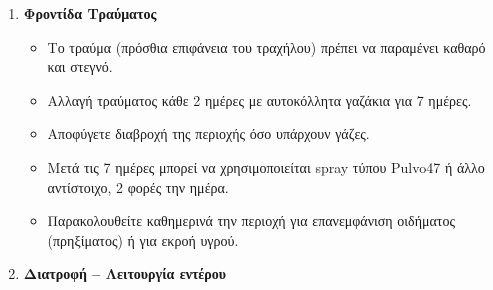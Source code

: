 \documentclass[10pt,greek]{article}
\begin{document}
\begin{enumerate}[label=\arabic*.]
\begin{itemize}
\item \textbf{Αναφέρετε άμεσα:} σοβαρή ή επιδεινούμενη δυσκολία κατάποσης, πνιγμονή, ή βράχνιασμα που δεν βελτιώνεται μετά τις 2 εβδομάδες.
    \end{itemize}
  \item \textbf{Φροντίδα Τραύματος}
      \begin{itemize}
\item Το τραύμα (πρόσθια επιφάνεια του τραχήλου) πρέπει να παραμένει καθαρό και στεγνό.
\item Αλλαγή τραύματος κάθε 2 ημέρες με αυτοκόλλητα γαζάκια για 7 ημέρες.
\item Αποφύγετε διαβροχή της περιοχής όσο υπάρχουν γάζες.
\item Μετά τις 7 ημέρες μπορεί να χρησιμοποιείται spray τύπου Pulvo47 ή άλλο αντίστοιχο, 2 φορές την ημέρα.
\item Παρακολουθείτε καθημερινά την περιοχή για επανεμφάνιση οιδήματος (πρηξίματος) ή για εκροή υγρού.
    \end{itemize}
  \item \textbf{Διατροφή -- Λειτουργία εντέρου}

\end{enumerate}
\end{document}
